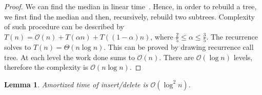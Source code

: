 \documentclass[10pt,a4paper]{article}
\newtheorem{lemma}{Lemma}
\newcommand{\Oh}{\mathcal{O}}
\begin{document}
\begin{proof}
We can find the median in linear time~\cite{FIVE}. Hence, in order to rebuild a tree, we first find the median and then, recursively, rebuild two subtrees. Complexity of such procedure can be described by $T(n)=\Oh(n)+T(\alpha n)+T((1-\alpha)n)$, where $\frac{2}{5}\leq \alpha \leq \frac{3}{5}$. The recurrence solves to $T(n)=\Theta(n\log n)$. This can be proved by drawing recurrence call tree. At each level the work done sums to $\Oh(n)$. There are $\Oh(\log n)$ levels, therefore the complexity is $\Oh(n \log n)$.
\end{proof}

\begin{lemma}\label{lem:2}
Amortized time of insert/delete is $\Oh(\log^2 n)$.
\end{lemma}
\end{document}
